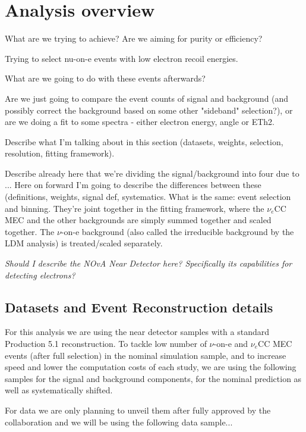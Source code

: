 \section{Analysis overview}
What are we trying to achieve? Are we aiming for purity or efficiency?

Trying to select nu-on-e events with low electron recoil energies.

What are we going to do with these events afterwards? 

Are we just going to compare the event counts of signal and background (and possibly correct the background based on some other "sideband" selection?), or are we doing a fit to some spectra - either electron energy, angle or ETh2.

Describe what I'm talking about in this section (datasets, weights, selection, resolution, fitting framework).

Describe already here that we're dividing the signal/background into four due to ... Here on forward I'm going to describe the differences between these (definitions, weights, signal def, systematics. What is the same: event selection and binning. They're joint together in the fitting framework, where the $\nu_e$CC MEC and the other backgrounds are simply summed together and scaled together. The $\nu$-on-e background (also called the irreducible background by the LDM analysis) is treated/scaled separately.

\textit{Should I describe the NOvA Near Detector here? Specifically its capabilities for detecting electrons?}

\subsection{Datasets and Event Reconstruction details}
For this analysis we are using the near detector samples with a standard Production 5.1 reconstruction. To tackle low number of $\nu$-on-e and $\nu_e$CC MEC events (after full selection) in the nominal simulation sample, and to increase speed and lower the computation costs of each study, we are using the following samples for the signal and background components, for the nominal prediction as well as systematically shifted.

For data we are only planning to unveil them after fully approved by the collaboration and we will be using the following data sample...

